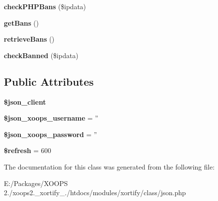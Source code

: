 \begin{DoxyCompactItemize}
\item 
\hypertarget{class_j_s_o_n_xortify_exchange_ae2454f7bceb92e9a841a5b534df0ddad}{{\bfseries check\-P\-H\-P\-Bans} (\$ipdata)}\label{class_j_s_o_n_xortify_exchange_ae2454f7bceb92e9a841a5b534df0ddad}

\item 
\hypertarget{class_j_s_o_n_xortify_exchange_abed88818d5ac42c8f7aa199612e063ff}{{\bfseries get\-Bans} ()}\label{class_j_s_o_n_xortify_exchange_abed88818d5ac42c8f7aa199612e063ff}

\item 
\hypertarget{class_j_s_o_n_xortify_exchange_a259b2839241b55429573235c82678ff2}{{\bfseries retrieve\-Bans} ()}\label{class_j_s_o_n_xortify_exchange_a259b2839241b55429573235c82678ff2}

\item 
\hypertarget{class_j_s_o_n_xortify_exchange_ac67a61967470681257f34a95d208e058}{{\bfseries check\-Banned} (\$ipdata)}\label{class_j_s_o_n_xortify_exchange_ac67a61967470681257f34a95d208e058}

\end{DoxyCompactItemize}
\subsection*{Public Attributes}
\begin{DoxyCompactItemize}
\item 
\hypertarget{class_j_s_o_n_xortify_exchange_a50ce0f2d60e1bae52bf757ec315e9a3e}{{\bfseries \$json\-\_\-client}}\label{class_j_s_o_n_xortify_exchange_a50ce0f2d60e1bae52bf757ec315e9a3e}

\item 
\hypertarget{class_j_s_o_n_xortify_exchange_ac0341689cec6a7b4be737ad8ef64653a}{{\bfseries \$json\-\_\-xoops\-\_\-username} = ''}\label{class_j_s_o_n_xortify_exchange_ac0341689cec6a7b4be737ad8ef64653a}

\item 
\hypertarget{class_j_s_o_n_xortify_exchange_ad262e88c40aa39310bd65bc4d1f97009}{{\bfseries \$json\-\_\-xoops\-\_\-password} = ''}\label{class_j_s_o_n_xortify_exchange_ad262e88c40aa39310bd65bc4d1f97009}

\item 
\hypertarget{class_j_s_o_n_xortify_exchange_aec9e7466612fa2a256570db71731be52}{{\bfseries \$refresh} = 600}\label{class_j_s_o_n_xortify_exchange_aec9e7466612fa2a256570db71731be52}

\end{DoxyCompactItemize}


The documentation for this class was generated from the following file\-:\begin{DoxyCompactItemize}
\item 
E\-:/\-Packages/\-X\-O\-O\-P\-S 2./xoops2.\-\_\-xortify\-\_./htdocs/modules/xortify/class/json.\-php\end{DoxyCompactItemize}
